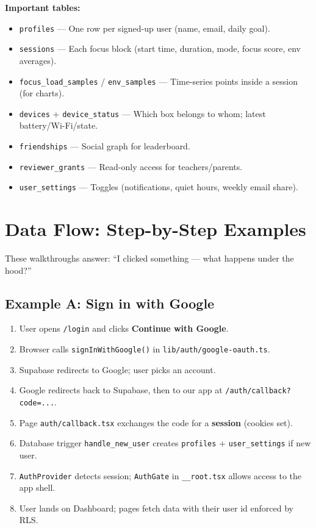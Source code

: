\documentclass[11pt,a4paper]{article}
\newcommand{\filepath}[1]{\texttt{#1}}
\begin{document}
\textbf{Important tables:}

\begin{itemize}[leftmargin=*]
  \item \texttt{profiles} --- One row per signed-up user (name, email, daily goal).
  \item \texttt{sessions} --- Each focus block (start time, duration, mode, focus score, env averages).
  \item \texttt{focus\_load\_samples} / \texttt{env\_samples} --- Time-series points inside a session (for charts).
  \item \texttt{devices} + \texttt{device\_status} --- Which box belongs to whom; latest battery/Wi-Fi/state.
  \item \texttt{friendships} --- Social graph for leaderboard.
  \item \texttt{reviewer\_grants} --- Read-only access for teachers/parents.
  \item \texttt{user\_settings} --- Toggles (notifications, quiet hours, weekly email share).
\end{itemize}

\section{Data Flow: Step-by-Step Examples}

These walkthroughs answer: ``I clicked something --- what happens under the hood?''

\subsection{Example A: Sign in with Google}

\begin{enumerate}[leftmargin=*]
  \item User opens \filepath{/login} and clicks \textbf{Continue with Google}.
  \item Browser calls \texttt{signInWithGoogle()} in \filepath{lib/auth/google-oauth.ts}.
  \item Supabase redirects to Google; user picks an account.
  \item Google redirects back to Supabase, then to our app at \filepath{/auth/callback?code=...}.
  \item Page \filepath{auth/callback.tsx} exchanges the code for a \textbf{session} (cookies set).
  \item Database trigger \texttt{handle\_new\_user} creates \texttt{profiles} + \texttt{user\_settings} if new user.
  \item \filepath{AuthProvider} detects session; \filepath{AuthGate} in \filepath{\_\_root.tsx} allows access to the app shell.
  \item User lands on Dashboard; pages fetch data with their user id enforced by RLS.
\end{enumerate}
\end{document}
